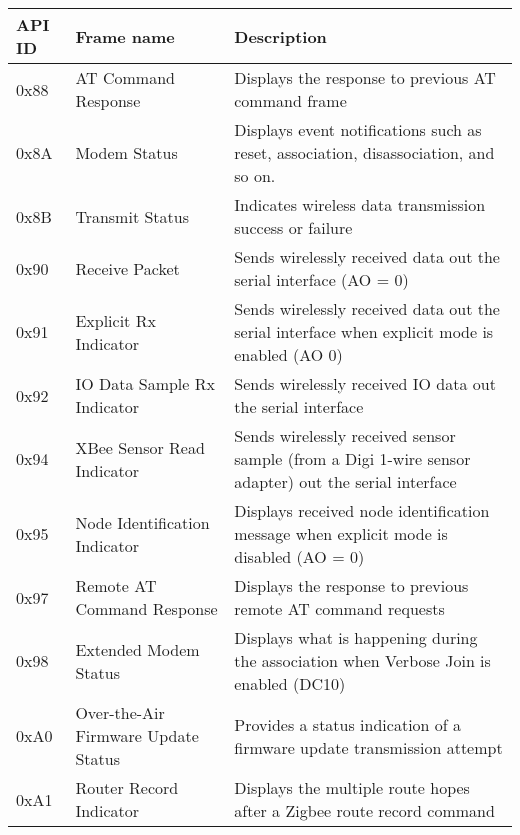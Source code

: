\begin{table}[htbp]
    \begin{tabular}{@{}lll@{}}
    \toprule
    API ID & Frame name                          & Description                                                                                          \\ \midrule
    0x88   & AT Command Response                 & Displays the response to previous AT command frame                                                   \\
    0x8A   & Modem Status                        & Displays event notifications such as reset, association, disassociation, and so on.                  \\
    0x8B   & Transmit Status                     & Indicates wireless data transmission success or failure                                              \\
    0x90   & Receive Packet                      & Sends wirelessly received data out the serial interface (AO = 0)                                     \\
    0x91   & Explicit Rx Indicator               & Sends wirelessly received data out the serial interface when explicit mode is enabled (AO 0)         \\
    0x92   & IO Data Sample Rx Indicator         & Sends wirelessly received IO data out the serial interface                                           \\
    0x94   & XBee Sensor Read Indicator          & Sends wirelessly received sensor sample (from a Digi 1-wire sensor adapter) out the serial interface \\
    0x95   & Node Identification Indicator       & Displays received node identification message when explicit mode is disabled (AO = 0)                \\
    0x97   & Remote AT Command Response          & Displays the response to previous remote AT command requests                                         \\
    0x98   & Extended Modem Status               & Displays what is happening during the association when Verbose Join is enabled (DC10)                \\
    0xA0   & Over-the-Air Firmware Update Status & Provides a status indication of a firmware update transmission attempt                               \\
    0xA1   & Router Record Indicator             & Displays the multiple route hopes after a Zigbee route record command                                \\

\end{tabular}
\end{table}
